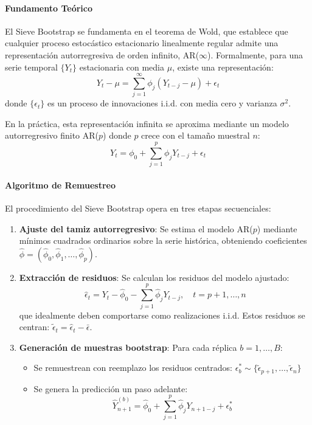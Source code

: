 \paragraph{Fundamento Teórico}
El Sieve Bootstrap se fundamenta en el teorema de Wold, que establece que cualquier proceso estocástico estacionario linealmente regular admite una representación autorregresiva de orden infinito, AR($\infty$). Formalmente, para una serie temporal $\{Y_t\}$ estacionaria con media $\mu$, existe una representación:
\begin{equation}
Y_t - \mu = \sum_{j=1}^{\infty} \phi_j (Y_{t-j} - \mu) + \epsilon_t
\end{equation}
donde $\{\epsilon_t\}$ es un proceso de innovaciones i.i.d. con media cero y varianza $\sigma^2$.

En la práctica, esta representación infinita se aproxima mediante un modelo autorregresivo finito AR($p$) donde $p$ crece con el tamaño muestral $n$:
\begin{equation}
Y_t = \phi_0 + \sum_{j=1}^{p} \phi_j Y_{t-j} + \epsilon_t
\end{equation}

\paragraph{Algoritmo de Remuestreo}
El procedimiento del Sieve Bootstrap opera en tres etapas secuenciales:

\begin{enumerate}
    \item \textbf{Ajuste del tamiz autorregresivo}: Se estima el modelo AR($p$) mediante mínimos cuadrados ordinarios sobre la serie histórica, obteniendo coeficientes $\hat{\phi} = (\hat{\phi}_0, \hat{\phi}_1, \dots, \hat{\phi}_p)$.
    
    \item \textbf{Extracción de residuos}: Se calculan los residuos del modelo ajustado:
    \begin{equation}
    \hat{\epsilon}_t = Y_t - \hat{\phi}_0 - \sum_{j=1}^{p} \hat{\phi}_j Y_{t-j}, \quad t = p+1, \dots, n
    \end{equation}
    que idealmente deben comportarse como realizaciones i.i.d. Estos residuos se centran: $\tilde{\epsilon}_t = \hat{\epsilon}_t - \bar{\epsilon}$.
    
    \item \textbf{Generación de muestras bootstrap}: Para cada réplica $b = 1, \dots, B$:
    \begin{itemize}
        \item Se remuestrean con reemplazo los residuos centrados: $\epsilon^*_b \sim \{\tilde{\epsilon}_{p+1}, \dots, \tilde{\epsilon}_n\}$
        \item Se genera la predicción un paso adelante:
        \begin{equation}
        \hat{Y}_{n+1}^{(b)} = \hat{\phi}_0 + \sum_{j=1}^{p} \hat{\phi}_j Y_{n+1-j} + \epsilon^*_b
        \end{equation}
    \end{itemize}
\end{enumerate}


